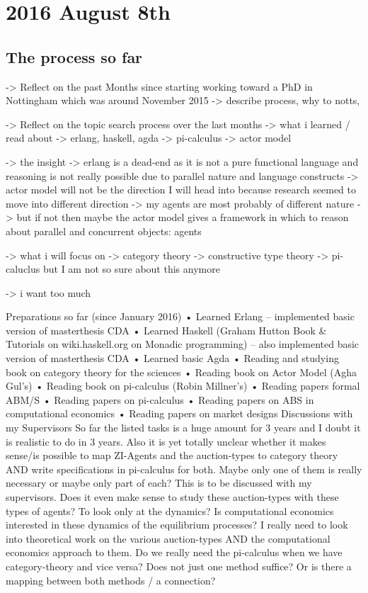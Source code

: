 \section*{2016 August 8th}
\subsection*{The process so far}

-> Reflect on the past Months since starting working toward a PhD in Nottingham which was around November 2015 
	-> describe process, why to notts, 
	
-> Reflect on the topic search process over the last months
	-> what i learned / read about
		-> erlang, haskell, agda
		-> pi-calculus
		-> actor model

	-> the insight 
		-> erlang is a dead-end as it is not a pure functional language and reasoning is not really possible due to parallel nature and language constructs 	
		-> actor model will not be the direction I will head into because research seemed to move into different direction
			-> my agents are most probably of different nature
			-> but if not then maybe the actor model gives a framework in which to reason about parallel and concurrent objects: agents
		
	-> what i will focus on
		-> category theory 
		-> constructive type theory 
		-> pi-caluclus but I am not so sure about this anymore
		
	-> i want too much


	Preparations so far (since January 2016)
•	Learned Erlang – implemented basic version of masterthesis CDA
•	Learned Haskell (Graham Hutton Book \& Tutorials on wiki.haskell.org on Monadic programming) – also implemented basic version of masterthesis CDA
•	Learned basic Agda 
•	Reading and studying book on category theory for the sciences
•	Reading book on Actor Model (Agha Gul’s)
•	Reading book on pi-calculus (Robin Millner’s)
•	Reading papers formal ABM/S
•	Reading papers on pi-calculus
•	Reading papers on ABS in computational economics
•	Reading papers on market designs
Discussions with my Supervisors
So far the listed tasks is a huge amount for 3 years and I doubt it is realistic to do in 3 years. Also it is yet totally unclear whether it makes sense/is possible to map ZI-Agents and the auction-types to category theory AND write specifications in pi-calculus for both. Maybe only one of them is really necessary or maybe only part of each? This is to be discussed with my supervisors.
Does it even make sense to study these auction-types with these types of agents? To look only at the dynamics? Is computational economics interested in these dynamics of the equilibrium processes? I really need to look into theoretical work on the various auction-types AND the computational economics approach to them.
Do we really need the pi-calculus when we have category-theory and vice versa? Does not just one method suffice? Or is there a mapping between both methods / a connection?

